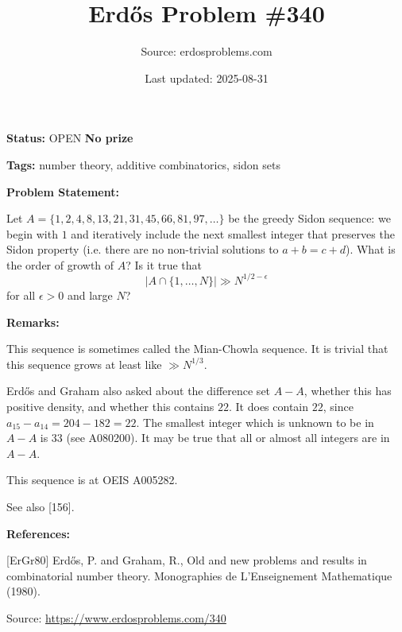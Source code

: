 \documentclass{article}
\title{Erd\H{o}s Problem \#340}
\date{Last updated: 2025-08-31}
\author{Source: erdosproblems.com}
\begin{document}
\maketitle

\noindent\textbf{Status:} OPEN \quad \textbf{No prize}

\noindent\textbf{Tags:} number theory, additive combinatorics, sidon sets

\medskip
\noindent\textbf{Problem Statement:}

Let $A=\{1,2,4,8,13,21,31,45,66,81,97,\ldots\}$ be the greedy Sidon sequence: we begin with $1$ and iteratively include the next smallest integer that preserves the Sidon property (i.e. there are no non-trivial solutions to $a+b=c+d$). What is the order of growth of $A$? Is it true that\[\lvert A\cap \{1,\ldots,N\}\rvert \gg N^{1/2-\epsilon}\]for all $\epsilon>0$ and large $N$?

\bigskip
\noindent\textbf{Remarks:}

This sequence is sometimes called the Mian-Chowla sequence. It is trivial that this sequence grows at least like $\gg N^{1/3}$. 

Erd\H{o}s and Graham \cite{ErGr80} also asked about the difference set $A-A$, whether this has positive density, and whether this contains $22$. It does contain $22$, since $a_{15}-a_{14}=204-182=22$. The smallest integer which is unknown to be in $A-A$ is $33$ (see A080200). It may be true that all or almost all integers are in $A-A$.

This sequence is at OEIS A005282.

See also [156].

\bigskip
\noindent\textbf{References:}

[ErGr80] Erd\H{o}s, P. and Graham, R., Old and new problems and results in combinatorial number theory. Monographies de L'Enseignement Mathematique (1980).

\bigskip
\noindent\small{Source: \url{https://www.erdosproblems.com/340}}
\end{document}
